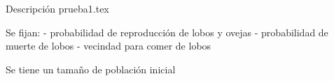 
Descripci\'on prueba1.tex

Se fijan: 
- probabilidad de reproducci\'on de lobos y ovejas
- probabilidad de muerte de lobos
- vecindad para comer de lobos

Se tiene un tama\~no de poblaci\'on inicial

